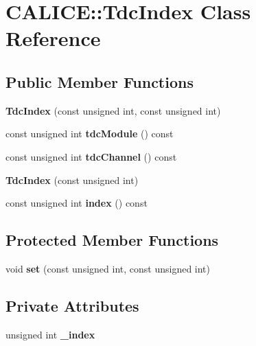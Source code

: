 \section{C\-A\-L\-I\-C\-E\-:\-:Tdc\-Index Class Reference}
\label{classCALICE_1_1TdcIndex}
\subsection*{Public Member Functions}
\begin{DoxyCompactItemize}
\item 
{\bfseries Tdc\-Index} (const unsigned int, const unsigned int)\label{classCALICE_1_1TdcIndex_a738f7f801a98797aca2230def176fd03}

\item 
const unsigned int {\bfseries tdc\-Module} () const \label{classCALICE_1_1TdcIndex_a3421cdcbbdf20f86d88f61c311624c2c}

\item 
const unsigned int {\bfseries tdc\-Channel} () const \label{classCALICE_1_1TdcIndex_a30f92c56a4ed1d856dd758fb9a1e12ce}

\item 
{\bfseries Tdc\-Index} (const unsigned int)\label{classCALICE_1_1TdcIndex_a72c3f77205c47e38607e2926e8088070}

\item 
const unsigned int {\bfseries index} () const \label{classCALICE_1_1TdcIndex_afbe2ae4dd14c9081d86c8425cd22e148}

\end{DoxyCompactItemize}
\subsection*{Protected Member Functions}
\begin{DoxyCompactItemize}
\item 
void {\bfseries set} (const unsigned int, const unsigned int)\label{classCALICE_1_1TdcIndex_a224187082dd245dce7870c9d0bc0d1c4}

\end{DoxyCompactItemize}
\subsection*{Private Attributes}
\begin{DoxyCompactItemize}
\item 
unsigned int {\bfseries \-\_\-index}\label{classCALICE_1_1TdcIndex_a680c6d9365daba7bb081c8f75fd0f856}

\end{DoxyCompactItemize}

